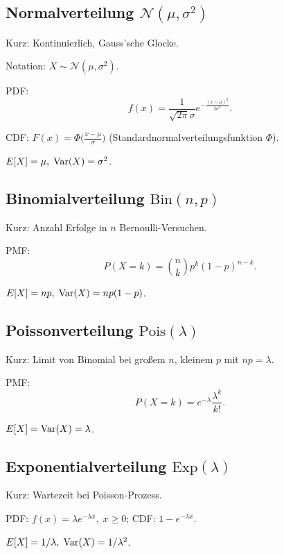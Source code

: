 \documentclass[11pt,a4paper]{article}
\begin{document}
\subsection*{Normalverteilung $\mathcal N(\mu,\sigma^2)$}
\begin{compactenum}
\item Kurz: Kontinuierlich, Gauss'sche Glocke.
\item Notation: $X\sim\mathcal N(\mu,\sigma^2)$.
\item PDF: \[f(x)=\frac{1}{\sqrt{2\pi}\sigma}e^{-\frac{(x-\mu)^2}{2\sigma^2}}.\]
\item CDF: $F(x)=\Phi\big(\frac{x-\mu}{\sigma}\big)$ (Standardnormalverteilungsfunktion $\Phi$).
\item $E[X]=\mu,\;\mathrm{Var}(X)=\sigma^2$.
\end{compactenum}

\subsection*{Binomialverteilung $\mathrm{Bin}(n,p)$}
\begin{compactenum}
\item Kurz: Anzahl Erfolge in $n$ Bernoulli-Versuchen.
\item PMF: \[P(X=k)=\binom{n}{k}p^k(1-p)^{n-k}.
\]
\item $E[X]=np,\;\mathrm{Var}(X)=np(1-p)$.
\end{compactenum}

\subsection*{Poissonverteilung $\mathrm{Pois}(\lambda)$}
\begin{compactenum}
\item Kurz: Limit von Binomial bei großem $n$, kleinem $p$ mit $np=\lambda$.
\item PMF: \[P(X=k)=e^{-\lambda}\frac{\lambda^k}{k!}.
\]
\item $E[X]=\mathrm{Var}(X)=\lambda$.
\end{compactenum}

\subsection*{Exponentialverteilung $\mathrm{Exp}(\lambda)$}
\begin{compactenum}
\item Kurz: Wartezeit bei Poisson-Prozess.
\item PDF: $f(x)=\lambda e^{-\lambda x},\;x\ge0$; CDF: $1-e^{-\lambda x}$.
\item $E[X]=1/\lambda,\;\mathrm{Var}(X)=1/\lambda^2$.
\end{compactenum}
\end{document}
